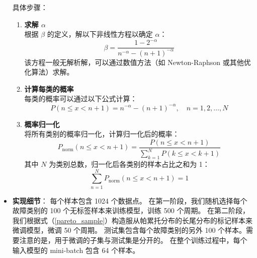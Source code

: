 \documentclass[master]{thesis-uestc}
\begin{document}
\begin{itemize}
    具体步骤：

    \begin{enumerate}
        \item \textbf{求解 $\alpha$} \\
        根据 $\beta$ 的定义，解以下非线性方程以确定 $\alpha$：
        \begin{equation}
        \beta = \frac{1 - 2^{-\alpha}}{n^{-\alpha} - (n+1)^{-\alpha}}
        \end{equation}
        该方程一般无解析解，可以通过数值方法（如 Newton-Raphson 或其他优化算法）求解。

        \item \textbf{计算每类的概率} \\
        每类的概率可以通过以下公式计算：
        \begin{equation}
        P(n \leq x < n+1) = n^{-\alpha} - (n+1)^{-\alpha}, \quad n = 1, 2, \dots, N
        \end{equation}

        \item \textbf{概率归一化} \\
        将所有类别的概率归一化，计算归一化后的概率：
        \begin{equation}
        P_{\text{norm}}(n \leq x < n+1) = \frac{P(n \leq x < n+1)}{\sum_{k=1}^N P(k \leq x < k+1)}
        \label{pareto_sample}
        \end{equation}
        其中 $N$ 为类别总数，归一化后各类别的样本占比之和为 1：
        \begin{equation}
        \sum_{n=1}^N P_{\text{norm}}(n \leq x < n+1) = 1
        \end{equation}
    \end{enumerate}
    \item \textbf{实现细节}：
        每个样本包含 1024 个数据点。
        在第一阶段，我们随机选择每个故障类别的 100 个无标签样本来训练模型，训练 500 个周期。
        在第二阶段，我们根据式（\ref{pareto_sample}）构造服从帕累托分布的长尾分布的标记样本来微调模型，微调 50 个周期。
        测试集包含每个故障类别的另外 100 个样本。需要注意的是，用于微调的子集与测试集是分开的。
        在整个训练过程中，每个输入模型的 mini-batch 包含 64 个样本。
\end{itemize}
\end{document}
